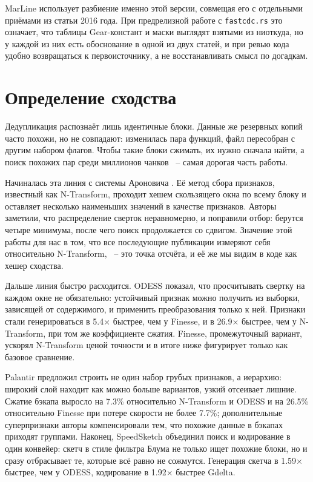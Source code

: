 \documentclass[a4paper]{article}
\begin{document}
MarLine использует разбиение именно этой версии, совмещая его с отдельными
приёмами из статьи 2016 года. При предрелизной работе с
\texttt{fastcdc.rs} это означает, что таблицы Gear-констант и маски
выглядят взятыми из ниоткуда, но у каждой из них есть обоснование в одной из
двух статей, и при ревью кода удобно возвращаться к первоисточнику, а не
восстанавливать смысл по догадкам.

\section{Определение сходства}

Дедупликация распознаёт лишь идентичные блоки. Данные же резервных копий
часто похожи, но не совпадают: изменилась пара функций, файл пересобран
с другим набором флагов. Чтобы такие блоки сжимать, их нужно сначала найти,
а поиск похожих пар среди миллионов чанков ~-- самая дорогая часть работы.

Начиналась эта линия с системы Ароновича \cite{aronovich09}. Её метод сбора
признаков, известный как N-Transform, проходит хешем скользящего окна по
всему блоку и оставляет несколько наименьших значений в качестве признаков.
Авторы заметили, что распределение сверток неравномерно, и поправили отбор:
берутся четыре минимума, после чего поиск продолжается со сдвигом. Значение
этой работы для нас в том, что все последующие публикации измеряют себя
относительно N-Transform, ~-- это точка отсчёта, и её же мы видим в коде
как хешер сходства.

Дальше линия быстро расходится. ODESS \cite{odess2021} показал, что
просчитывать свертку на каждом окне не обязательно: устойчивый признак можно
получить из выборки, зависящей от содержимого, и применить преобразования
только к ней. Признаки стали генерироваться в 5.4$\times$ быстрее, чем у
Finesse, и в 26.9$\times$ быстрее, чем у N-Transform, при том же коэффициенте
сжатия. Finesse, промежуточный вариант, ускорял N-Transform ценой точности и
в итоге ниже фигурирует только как базовое сравнение.

Palantir \cite{palantir2024} предложил строить не один набор грубых
признаков, а иерархию: широкий слой находит как можно больше вариантов,
узкий отсеивает лишние. Сжатие бэкапа выросло на 7.3\% относительно
N-Transform и ODESS и на 26.5\% относительно Finesse при потере скорости не
более 7.7\%; дополнительные суперпризнаки авторы компенсировали тем, что
похожие данные в бэкапах приходят группами. Наконец, SpeedSketch
\cite{speedsketch2025} объединил поиск и кодирование в один конвейер: скетч
в стиле фильтра Блума не только ищет похожие блоки, но и сразу отбрасывает
те, которые всё равно не сожмутся. Генерация скетча в 1.59$\times$ быстрее,
чем у ODESS, кодирование в 1.92$\times$ быстрее Gdelta.
\end{document}
